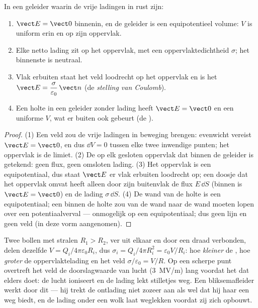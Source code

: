 \begin{theorem}\label{thm:b1:potential-capacitors:conductor}
In een geleider waarin de vrije ladingen in rust zijn:
\begin{enumerate}
  \item $\vect E = \vect 0$ binnenin, en de geleider is een equipotentieel
        volume: $V$ is uniform erin en op zijn oppervlak.
  \item Elke netto lading zit op het oppervlak, met een oppervlaktedichtheid
        $\sigma$; het binnenste is neutraal.
  \item Vlak erbuiten staat het veld loodrecht op het oppervlak en is het
        $\vect E = \dfrac{\sigma}{\varepsilon_0}\,\vect n$ (de \emph{stelling van Coulomb}).
  \item Een holte in een geleider zonder lading heeft $\vect E =
        \vect 0$ en een uniforme $V$, wat er buiten ook gebeurt (de \emph{}).
\end{enumerate}
\end{theorem}

\begin{proof}
(1) Een veld zou de vrije ladingen in beweging brengen: evenwicht vereist $\vect E =
\vect 0$, en dus $\dd V = 0$ tussen elke twee inwendige punten; het oppervlak is
de limiet. (2) De  op elk gesloten oppervlak dat binnen de
geleider is getekend: geen flux, geen omsloten lading. (3) Het oppervlak is een
equipotentiaal, dus staat $\vect E$ er vlak erbuiten loodrecht op; een doosje
dat het oppervlak omvat heeft alleen door zijn buitenvlak de flux $E\,\dd S$
(binnen is $\vect E = \vect 0$) en de lading $\sigma\,\dd S$. (4) De wand van de holte
is een equipotentiaal; een  binnen de holte zou van de wand naar de
wand moeten lopen over een potentiaalverval --- onmogelijk op
een equipotentiaal; dus geen lijn en geen veld (in deze vorm aangenomen).
\end{proof}

\begin{example}\label{ex:b1:potential-capacitors:point}
Twee bollen met stralen $R_1 > R_2$, ver uit elkaar en door een draad verbonden, delen
dezelfde $V = Q_i/4\pi\varepsilon_0R_i$, dus $\sigma_i = Q_i/4\pi R_i^2 = \varepsilon_0V/R_i$:
hoe \emph{kleiner} de , hoe \emph{groter} de oppervlaktelading
en het veld $\sigma/\varepsilon_0 = V/R$. Op een scherpe punt overtreft het veld
de doorslagwaarde van lucht (\qty{3}{MV/m}) lang voordat het dat
elders doet: de lucht ioniseert en de lading lekt stilletjes weg. Een
bliksemafleider werkt door dit \emph{} --- hij trekt de ontlading niet
zozeer aan als wel dat hij haar een weg biedt, en de lading onder een
wolk laat weglekken voordat zij zich opbouwt.
\end{example}

